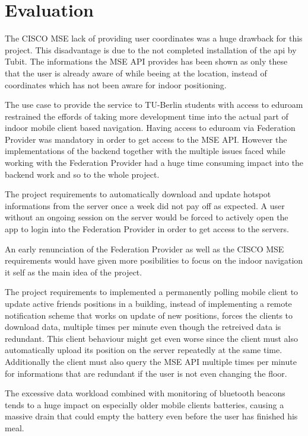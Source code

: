 \chapter{Evaluation}
\label{cha:evaluation}


The CISCO MSE lack of providing user coordinates was a huge drawback for this project. This disadvantage is due to the not completed installation of the api by Tubit. The informations the MSE API provides has been shown as only these that the user is already aware of while beeing at the location, instead of coordinates which has not been aware for indoor positioning.

The use case to provide the service to TU-Berlin students with access to eduroam restrained the effords of taking more development time into the actual part of indoor mobile client based navigation. Having access to eduroam via Federation Provider was mandatory in order to get access to the MSE API. However the implementations of the backend together with the multiple issues faced while working with the Federation Provider had a huge time consuming impact into the backend work and so to the whole project. 

The project requirements to automatically download and update hotspot informations from the server once a week did not pay off as expected. A user without an ongoing session on the server would be forced to actively open the app to login into the Federation Provider in order to get access to the servers. 

An early renunciation of the Federation Provider as well as the CISCO MSE requirements would have given more posibilities to focus on the indoor navigation it self as the main idea of the project.



The project requirements to implemented a permanently polling mobile client to update 
 active friends positions in a building, instead of implementing a remote notification scheme that works on update of new positions, forces the clients to download data, multiple times per minute even though the retreived data is redundant.
This client behaviour might get even worse since the client must also automatically upload its position on the server repeatedly at the same time. Additionally the client must also query the MSE API multiple times per minute for informations that are redundant if the user is not even changing the floor.
  
  The excessive data workload combined with monitoring of bluetooth beacons tends to a huge impact on 
especially older mobile clients batteries, causing a massive drain that could empty the battery even before the user has finished his meal.



